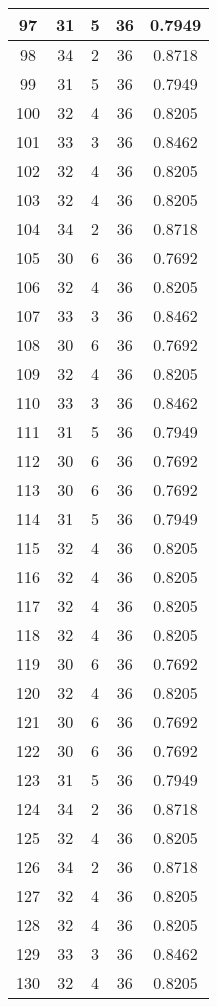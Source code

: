 \documentclass[letterpaper, 12pt]{article}
\begin{document}
\begin{longtable}{|c|c|c|c|c|}
\hline
97 & 31 & 5 & 36 & 0.7949 \\
\hline
98 & 34 & 2 & 36 & 0.8718 \\
\hline
99 & 31 & 5 & 36 & 0.7949 \\
\hline
100 & 32 & 4 & 36 & 0.8205 \\
\hline
101 & 33 & 3 & 36 & 0.8462 \\
\hline
102 & 32 & 4 & 36 & 0.8205 \\
\hline
103 & 32 & 4 & 36 & 0.8205 \\
\hline
104 & 34 & 2 & 36 & 0.8718 \\
\hline
105 & 30 & 6 & 36 & 0.7692 \\
\hline
106 & 32 & 4 & 36 & 0.8205 \\
\hline
107 & 33 & 3 & 36 & 0.8462 \\
\hline
108 & 30 & 6 & 36 & 0.7692 \\
\hline
109 & 32 & 4 & 36 & 0.8205 \\
\hline
110 & 33 & 3 & 36 & 0.8462 \\
\hline
111 & 31 & 5 & 36 & 0.7949 \\
\hline
112 & 30 & 6 & 36 & 0.7692 \\
\hline
113 & 30 & 6 & 36 & 0.7692 \\
\hline
114 & 31 & 5 & 36 & 0.7949 \\
\hline
115 & 32 & 4 & 36 & 0.8205 \\
\hline
116 & 32 & 4 & 36 & 0.8205 \\
\hline
117 & 32 & 4 & 36 & 0.8205 \\
\hline
118 & 32 & 4 & 36 & 0.8205 \\
\hline
119 & 30 & 6 & 36 & 0.7692 \\
\hline
120 & 32 & 4 & 36 & 0.8205 \\
\hline
121 & 30 & 6 & 36 & 0.7692 \\
\hline
122 & 30 & 6 & 36 & 0.7692 \\
\hline
123 & 31 & 5 & 36 & 0.7949 \\
\hline
124 & 34 & 2 & 36 & 0.8718 \\
\hline
125 & 32 & 4 & 36 & 0.8205 \\
\hline
126 & 34 & 2 & 36 & 0.8718 \\
\hline
127 & 32 & 4 & 36 & 0.8205 \\
\hline
128 & 32 & 4 & 36 & 0.8205 \\
\hline
129 & 33 & 3 & 36 & 0.8462 \\
\hline
130 & 32 & 4 & 36 & 0.8205 \\

\end{longtable}
\end{document}

